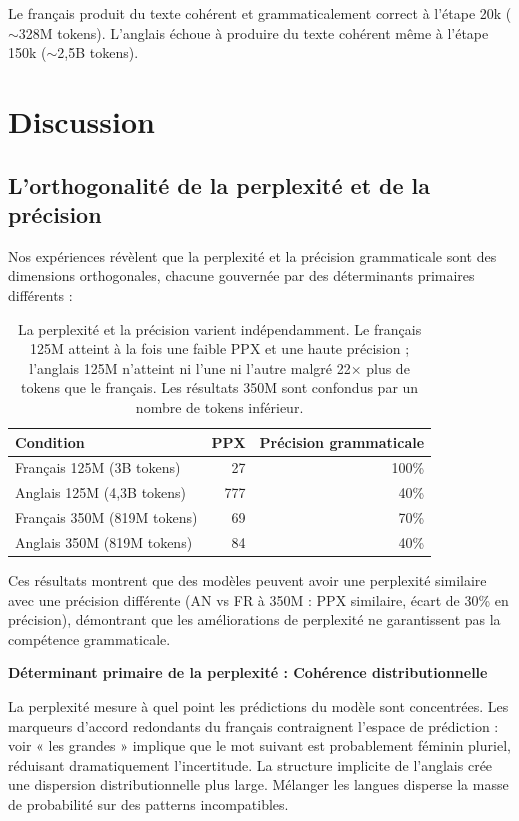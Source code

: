 \documentclass[11pt,a4paper]{article}
\begin{document}
Le français produit du texte cohérent et grammaticalement correct à l'étape 20k ($\sim$328M tokens). L'anglais échoue à produire du texte cohérent même à l'étape 150k ($\sim$2,5B tokens).

\section{Discussion}

\subsection{L'orthogonalité de la perplexité et de la précision}

Nos expériences révèlent que la perplexité et la précision grammaticale sont des dimensions orthogonales, chacune gouvernée par des déterminants primaires différents :

\begin{table}[H]
\centering
\begin{tabular}{lrr}
\toprule
\textbf{Condition} & \textbf{PPX} & \textbf{Précision grammaticale} \\
\midrule
Français 125M (3B tokens) & 27 & 100\% \\
Anglais 125M (4,3B tokens) & 777 & 40\% \\
Français 350M (819M tokens) & 69 & 70\% \\
Anglais 350M (819M tokens) & 84 & 40\% \\
\bottomrule
\end{tabular}
\caption{La perplexité et la précision varient indépendamment. Le français 125M atteint à la fois une faible PPX et une haute précision ; l'anglais 125M n'atteint ni l'une ni l'autre malgré 22$\times$ plus de tokens que le français. Les résultats 350M sont confondus par un nombre de tokens inférieur.}
\label{tab:orthogonality}
\end{table}

Ces résultats montrent que des modèles peuvent avoir une perplexité similaire avec une précision différente (AN vs FR à 350M : PPX similaire, écart de 30\% en précision), démontrant que les améliorations de perplexité ne garantissent pas la compétence grammaticale.

\textbf{Déterminant primaire de la perplexité : Cohérence distributionnelle}

La perplexité mesure à quel point les prédictions du modèle sont concentrées. Les marqueurs d'accord redondants du français contraignent l'espace de prédiction : voir « les grandes » implique que le mot suivant est probablement féminin pluriel, réduisant dramatiquement l'incertitude. La structure implicite de l'anglais crée une dispersion distributionnelle plus large. Mélanger les langues disperse la masse de probabilité sur des patterns incompatibles.
\end{document}

